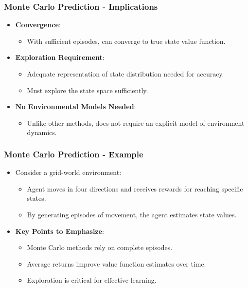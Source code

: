 \documentclass[aspectratio=169]{beamer}
\begin{document}
\begin{frame}[fragile]
    \frametitle{Monte Carlo Prediction - Implications}
    \begin{itemize}
        \item \textbf{Convergence}:
        \begin{itemize}
            \item With sufficient episodes, can converge to true state value function.
        \end{itemize}
        
        \item \textbf{Exploration Requirement}:
        \begin{itemize}
            \item Adequate representation of state distribution needed for accuracy.
            \item Must explore the state space sufficiently.
        \end{itemize}
        
        \item \textbf{No Environmental Models Needed}:
        \begin{itemize}
            \item Unlike other methods, does not require an explicit model of environment dynamics.
        \end{itemize}
    \end{itemize}
\end{frame}

\begin{frame}[fragile]
    \frametitle{Monte Carlo Prediction - Example}
    \begin{itemize}
        \item Consider a grid-world environment:
        \begin{itemize}
            \item Agent moves in four directions and receives rewards for reaching specific states.
            \item By generating episodes of movement, the agent estimates state values.
        \end{itemize}
        
        \item \textbf{Key Points to Emphasize}:
        \begin{itemize}
            \item Monte Carlo methods rely on complete episodes.
            \item Average returns improve value function estimates over time.
            \item Exploration is critical for effective learning.
        \end{itemize}
    \end{itemize}
\end{frame}
\end{document}
